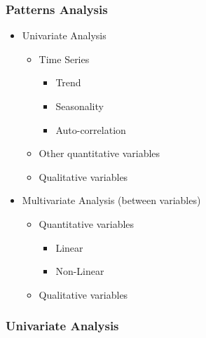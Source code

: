\begin{frame}\frametitle{Patterns Analysis}
   \begin{itemize}
      \item Univariate Analysis
      \begin{itemize}
         \item Time Series
         \begin{itemize}
            \item Trend
            \item Seasonality
            \item Auto-correlation
         \end{itemize}
         \item Other quantitative variables
         \item Qualitative variables
      \end{itemize}
      \item Multivariate Analysis (between variables)
      \begin{itemize}
         \item Quantitative variables
         \begin{itemize}
            \item Linear
            \item Non-Linear
         \end{itemize}
         \item Qualitative variables
      \end{itemize}
   \end{itemize}
\end{frame}


\subsubsection{Univariate Analysis}


